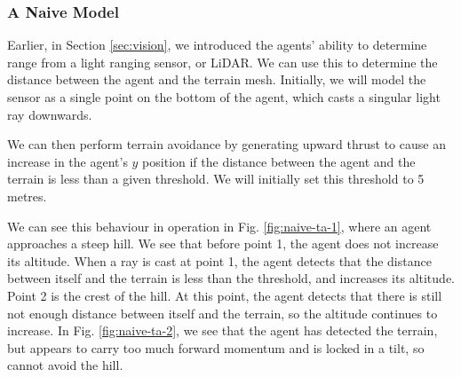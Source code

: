 \documentclass{article}
\begin{document}
\subsubsection{A Naive Model}
Earlier, in Section \ref{sec:vision}, we introduced the agents' ability to determine range from a light ranging sensor, or LiDAR. We can use this to determine the distance between the agent and the terrain mesh. Initially, we will model the sensor as a single point on the bottom of the agent, which casts a singular light ray downwards.

We can then perform terrain avoidance by generating upward thrust to cause an increase in the agent's $y$ position if the distance between the agent and the terrain is less than a given threshold. We will initially set this threshold to 5 metres.

We can see this behaviour in operation in Fig. \ref{fig:naive-ta-1}, where an agent approaches a steep hill. We see that before point 1, the agent does not increase its altitude. When a ray is cast at point 1, the agent detects that the distance between itself and the terrain is less than the threshold, and increases its altitude. Point 2 is the crest of the hill. At this point, the agent detects that there is still not enough distance between itself and the terrain, so the altitude continues to increase. In Fig. \ref{fig:naive-ta-2}, we see that the agent has detected the terrain, but appears to carry too much forward momentum and is locked in a tilt, so cannot avoid the hill.
\end{document}
